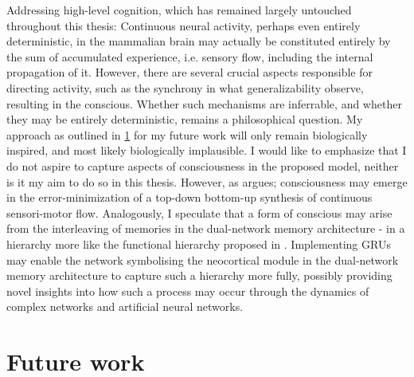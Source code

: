 Addressing high-level cognition, which has remained largely untouched throughout this thesis:
Continuous neural activity, perhaps even entirely deterministic, in the mammalian brain may actually be constituted entirely by the sum of accumulated experience, i.e. sensory flow, including the internal propagation of it. However, there are several crucial aspects responsible for directing activity, such as the synchrony in what generalizability observe, resulting in the conscious. Whether such mechanisms are inferrable, and whether they may be entirely deterministic, remains a philosophical question.
My approach as outlined in \ref{future_work} for my future work will only remain biologically inspired, and most likely biologically implausible. I would like to emphasize that I do not aspire to capture aspects of consciousness in the proposed model, neither is it my aim to do so in this thesis. However, as \cite{Tani2014} argues; consciousness may emerge in the error-minimization of a top-down bottom-up synthesis of continuous sensori-motor flow. Analogously, I speculate that a form of conscious may arise from the interleaving of memories in the dual-network memory architecture - in a hierarchy more like the functional hierarchy proposed in \citep{Yamashita2008, Tani2014}. Implementing GRUs may enable the network symbolising the neocortical module in the dual-network memory architecture to capture such a hierarchy more fully, possibly providing novel insights into how such a process may occur through the dynamics of complex networks and artificial neural networks.

\section{Future work}\label{future_work}

